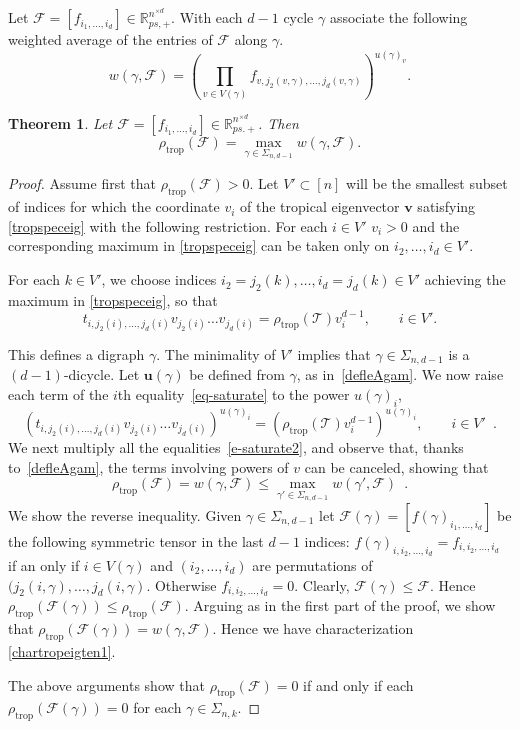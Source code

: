 \documentclass{amsart}
\newcommand{\R}{\mathbb{R}}
\newcommand{\uu}{\mathbf{u}}
\newcommand{\bv}{\mathbf{v}}
\newcommand{\0}{\mathbf{0}}
\newcommand{\1}{\mathbf{1}}
\newcommand{\cF}{\mathcal{F}}
\newcommand{\cT}{\mathcal{T}}
\newcommand{\trop}{\mathrm{trop}}
\newtheorem{theorem}[theo]{Theorem}
\theoremstyle{remark}
\numberwithin{equation}{section} %
\renewcommand{\leq}{\leqslant}
\renewcommand{\le}{\leqslant}
\begin{document}
 Let $\cF=[f_{i_1,\ldots,i_d}]\in \R_{ps,+}^{n^{\times d}}$.   With each $d-1$ cycle
 $\gamma$ associate the following weighted average of the entries of $\cF$ along $\gamma$.
  \begin{equation}\label{defwcycleten}
 w(\gamma,\cF)=(\prod_{v\in V(\gamma)} f_{v,j_2(v,\gamma),\ldots,j_d(v,\gamma)})^{u(\gamma)_v}.
 \end{equation}
 \begin{theorem}\label{chartropeigten}  Let $\cF=[f_{i_1,\ldots,i_d}]\in\R_{ps.+}^{n^{\times d}}$.  Then
 \begin{equation}\label{chartropeigten1}
 \rho_{\trop}(\cF)=\max_{\gamma\in\Sigma_{n,d-1}} w(\gamma,\cF).
 \end{equation}
 \end{theorem}
\begin{proof}
Assume first that $\rho_{\trop}(\cF)>0$.   Let $V'\subset [n]$ will be the smallest subset of indices for which the coordinate $v_i$ of the tropical eigenvector $\bv$ satisfying \eqref{tropspeceig} with the following restriction. For each $i\in V'$ $v_i>0$ and the corresponding maximum in \eqref{tropspeceig} can be taken only on $i_2,\ldots,i_d\in V'$.


For each $k\in V'$,
we choose indices
$i_2=j_2(k),\ldots,i_d=j_d(k)\in V'$
achieving the maximum in \eqref{tropspeceig}, so that
\begin{equation}
\label{eq-saturate}
t_{i,j_2(i),\ldots,j_d(i)} v_{j_2(i)}\ldots v_{j_d(i)}
 = \rho_{\trop}(\cT) v_i^{d-1}, \qquad i\in V'.
\end{equation}

%
%
%
This defines a digraph $\gamma$.  The minimality of $V'$ implies that $\gamma\in\Sigma_{n,d-1}$ is a $(d-1)$-dicycle.  Let $\uu(\gamma)$ be defined from $\gamma$,
as in~\eqref{defleAgam}.
We now raise each term of the $i$th equality~\eqref{eq-saturate} to the power
$u(\gamma)_i$, 
\begin{equation}\label{e-saturate2}
(t_{i,j_2(i),\ldots,j_d(i)} v_{j_2(i)}\ldots v_{j_d(i)} )^{u(\gamma)_i}
 = (\rho_{\trop}(\cT)v_i^{d-1})^{u(\gamma)_i}, \qquad i \in V' \enspace .
\end{equation}
We next multiply all the equalities~\eqref{e-saturate2}, and observe
that, thanks to~\eqref{defleAgam}, the terms involving powers of $v$ can be canceled, showing that
%
%
%
%
\[ \rho_{\trop}(\cF)= w(\gamma,\cF)
\leq \max_{\gamma'\in\Sigma_{n,d-1}} w(\gamma',\cF)
\enspace.\]
We show the reverse inequality. Given $\gamma\in \Sigma_{n,d-1}$ let $\cF(\gamma)=[f(\gamma)_{i_1,\ldots,i_d}]$ be the following symmetric tensor in the last $d-1$
 indices: $f(\gamma)_{i,i_2,\ldots,i_d}=f_{i,i_2,\ldots,i_d}$ if an only if $i\in V(\gamma)$ and  $(i_2,\ldots,i_d)$ are permutations of $(j_2(i,\gamma),
 \ldots,j_d(i,\gamma)$.  Otherwise $f_{i,i_2,\ldots,i_d}=0$.  Clearly, $\cF(\gamma)\le \cF$.  Hence $\rho_{\trop}(\cF(\gamma))\le \rho_{\trop}(\cF)$.
 Arguing as in the first part of the proof, we show that $\rho_{\trop}(\cF(\gamma))=w(\gamma,\cF)$.  Hence we have characterization \eqref{chartropeigten1}.

 The above arguments show that $\rho_{\trop}(\cF)=0$ if and only if each $\rho_{\trop}(\cF(\gamma))=0$ for each $\gamma\in\Sigma_{n,k}$.  
\end{proof}
\end{document}
